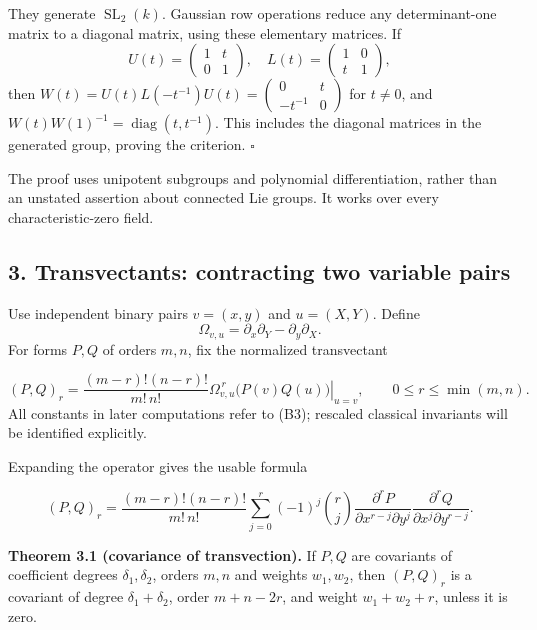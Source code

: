 \documentclass[
]{article}
\begin{document}
They generate \(\operatorname{SL}_2(k)\). Gaussian row operations reduce
any determinant-one matrix to a diagonal matrix, using these elementary
matrices. If \[
U(t)=\begin{pmatrix}1&t\\0&1\end{pmatrix},
\quad L(t)=\begin{pmatrix}1&0\\t&1\end{pmatrix},
\] then
\(W(t)=U(t)L(-t^{-1})U(t)=\left(\begin{smallmatrix}0&t\\-t^{-1}&0\end{smallmatrix}\right)\)
for \(t\ne0\), and \(W(t)W(1)^{-1}=\operatorname{diag}(t,t^{-1})\). This
includes the diagonal matrices in the generated group, proving the
criterion. \(\square\)

The proof uses unipotent subgroups and polynomial differentiation,
rather than an unstated assertion about connected Lie groups. It works
over every characteristic-zero field.

\subsection{3. Transvectants: contracting two variable
pairs}\label{section-3}

Use independent binary pairs \(v=(x,y)\) and \(u=(X,Y)\). Define \[
\Omega_{v,u}=\partial_x\partial_Y-\partial_y\partial_X.
\] For forms \(P,Q\) of orders \(m,n\), fix the normalized transvectant
\protect{}\label{equation-B3}{}

\[
(P,Q)_r=
\frac{(m-r)!(n-r)!}{m!\,n!}
\left.\Omega_{v,u}^{\,r}\bigl(P(v)Q(u)\bigr)\right|_{u=v},
\qquad 0\leq r\leq\min(m,n).
\tag{B3}
\] All constants in later computations refer to (B3); rescaled classical
invariants will be identified explicitly.

Expanding the operator gives the usable formula
\protect{}\label{equation-B4}{}

\[
(P,Q)_r=\frac{(m-r)!(n-r)!}{m!\,n!}
\sum_{j=0}^r(-1)^j\binom rj
\frac{\partial^rP}{\partial x^{r-j}\partial y^j}
\frac{\partial^rQ}{\partial x^j\partial y^{r-j}}.
\tag{B4}
\]

\protect{}\label{theorem-3-1}{}

\textbf{Theorem 3.1 (covariance of transvection).} If \(P,Q\) are
covariants of coefficient degrees \(\delta_1,\delta_2\), orders \(m,n\)
and weights \(w_1,w_2\), then \((P,Q)_r\) is a covariant of degree
\(\delta_1+\delta_2\), order \(m+n-2r\), and weight \(w_1+w_2+r\),
unless it is zero.
\end{document}
